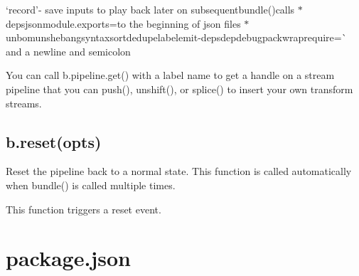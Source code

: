 \begin{DoxyItemize}
\item `\textquotesingle{}record'{\ttfamily -\/ save inputs to play back later on subsequent}bundle(){\ttfamily calls $\ast$}\textquotesingle{}deps\textquotesingle{}jsonmodule.\+exports={\ttfamily to the beginning of json files $\ast$}\textquotesingle{}unbom\textquotesingle{}unshebang\textquotesingle{}syntax\textquotesingle{}sort\textquotesingle{}dedupe\textquotesingle{}label\textquotesingle{}emit-\/deps\textquotesingle{}dep\textquotesingle{}debug\textquotesingle{}pack\textquotesingle{}wraprequire=\`{} and a newline and semicolon
\end{DoxyItemize}

You can call {\ttfamily b.\+pipeline.\+get()} with a label name to get a handle on a stream pipeline that you can {\ttfamily push()}, {\ttfamily unshift()}, or {\ttfamily splice()} to insert your own transform streams.

\subsection*{b.\+reset(opts)}

Reset the pipeline back to a normal state. This function is called automatically when {\ttfamily bundle()} is called multiple times.

This function triggers a \textquotesingle{}reset\textquotesingle{} event.

\section*{package.\+json}

